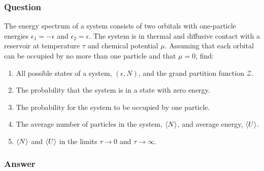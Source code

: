 \subsubsection{Question}
The energy spectrum of a system consists of two orbitals with one-particle energies ${\epsilon}_1 = -{\epsilon}$ and ${\epsilon}_2 = {\epsilon}$. The system is in thermal and diffusive contact with a reservoir at temperature ${\tau}$ and chemical potential ${\mu}$. Assuming that each orbital can be occupied by no more than one particle and that ${\mu} = 0$, find:
\begin{enumerate}
	\item All possible states of a system, $({\epsilon}, N)$, and the grand partition function $\mathcal{Z}$.
	\item The probability that the system is in a state with zero energy.
	\item The probability for the system to be occupied by one particle.
	\item The average number of particles in the system, $\expval{N}$, and average energy, $\expval{U}$.
	\item $\expval{N}$ and $\expval{U}$ in the limits ${\tau} {\to} 0$ and ${\tau} {\to} {\infty}$.
\end{enumerate}

\subsubsection{Answer}


